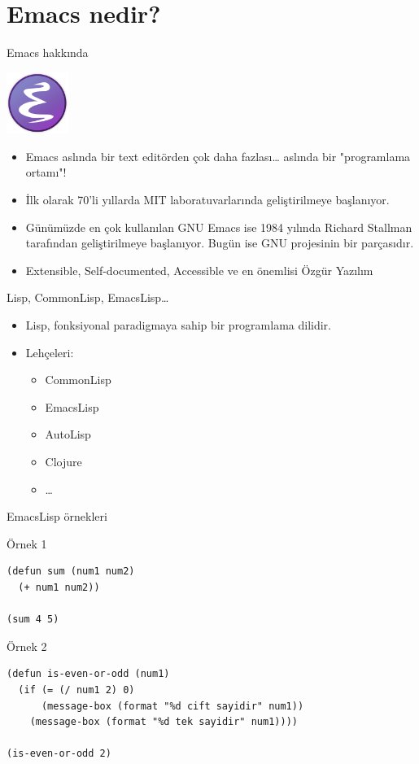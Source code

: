 \documentclass[presentation,smaller]{beamer}
\begin{document}
\section{Emacs nedir?}
\label{sec:orgee5f9d4}
\begin{frame}[label={sec:org6fabf35}]{Emacs hakkında}
\begin{center}
\includegraphics[height=2cm]{./_images/emacs_logo.png}
\end{center}

\begin{itemize}
\item Emacs aslında bir text editörden çok daha fazlası\ldots{} aslında bir "programlama ortamı"!
\item İlk olarak 70'li yıllarda MIT laboratuvarlarında geliştirilmeye başlanıyor.
\item Günümüzde en çok kullanılan GNU Emacs ise 1984 yılında Richard Stallman
tarafından geliştirilmeye başlanıyor. Bugün ise GNU projesinin bir parçasıdır.
\item Extensible, Self-documented, Accessible ve en önemlisi Özgür Yazılım
\end{itemize}
\end{frame}
\begin{frame}[label={sec:org1da5e8d}]{Lisp, CommonLisp, EmacsLisp\ldots{}}
\begin{itemize}
\item Lisp, fonksiyonal paradigmaya sahip bir programlama dilidir.
\item Lehçeleri:
\begin{itemize}
\item CommonLisp
\item EmacsLisp
\item AutoLisp
\item Clojure
\item \ldots{}
\end{itemize}
\end{itemize}
\end{frame}
\begin{frame}[label={sec:org7c12812},fragile]{EmacsLisp örnekleri}
 \begin{block}{Örnek 1}
\begin{verbatim}
(defun sum (num1 num2)
  (+ num1 num2))

(sum 4 5)
\end{verbatim}
\end{block}

\begin{block}{Örnek 2}
\begin{verbatim}
(defun is-even-or-odd (num1)
  (if (= (/ num1 2) 0)
      (message-box (format "%d cift sayidir" num1))
    (message-box (format "%d tek sayidir" num1))))

(is-even-or-odd 2)
\end{verbatim}
\end{block}
\end{frame}
\end{document}
